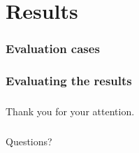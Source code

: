 \documentclass[18pt]{beamer}
\begin{document}
\section{Results}
\begin{frame}
  \frametitle{Evaluation cases}
\end{frame}


\begin{frame}
  \frametitle{Evaluating the results}
\end{frame}



\begin{frame}
  \frametitle{}
  \begin{center}
    \huge{Thank you for your attention.}
  \end{center}
\end{frame}

\begin{frame}
  \frametitle{}
  \begin{center}
    \huge{Questions?}
  \end{center}
\end{frame}
\end{document}
